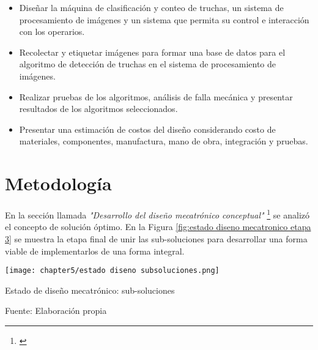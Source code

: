 \begin{itemize}
	\item Diseñar la máquina de clasificación y conteo de truchas, un sistema de procesamiento de imágenes y un sistema que permita su control e interacción con los operarios.
	\item Recolectar y etiquetar imágenes para formar una base de datos para el algoritmo de detección de truchas en el sistema de procesamiento de imágenes.
	\item Realizar pruebas de los algoritmos, análisis de falla mecánica y presentar resultados de los algoritmos seleccionados.
	\item Presentar una estimación de costos del diseño considerando costo de materiales, componentes, manufactura, mano de obra, integración y pruebas.
\end{itemize}



\section{Metodología}

En la sección llamada \textit{"Desarrollo del diseño mecatrónico conceptual"} \footnote{\cite{DiazVergara2020}} se analizó el concepto de solución óptimo. En la Figura \ref{fig:estado diseno mecatronico etapa 3} se muestra la etapa final de unir las sub-soluciones para desarrollar una forma viable de implementarlos de una forma integral.

\begin{myfigure}[H]
	\footnotesize\centering
	\texttt{[image: chapter5/estado diseno subsoluciones.png]}
	\caption{Estado de diseño mecatrónico: sub-soluciones}
	\begin{myflushcenter}
		Fuente: Elaboración propia
	\end{myflushcenter}
	\label{fig:estado diseno mecatronico etapa 3}
\end{myfigure}

